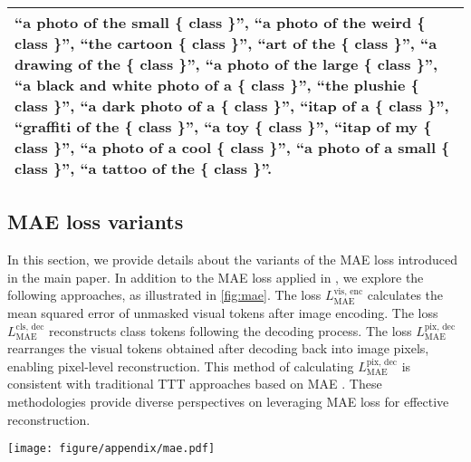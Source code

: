 \begin{table*}[t]
\begin{tabularx}{\textwidth}{X}
        ``a photo of the small \{ class \}'', ``a photo of the weird \{ class \}'', ``the cartoon \{ class \}'', ``art of the \{ class \}'', 
        ``a drawing of the \{ class \}'', ``a photo of the large \{ class \}'', ``a black and white photo of a \{ class \}'', ``the plushie \{ class \}'', 
        ``a dark photo of a \{ class \}'', ``itap of a \{ class \}'', ``graffiti of the \{ class \}'', ``a toy \{ class \}'', ``itap of my \{ class \}'', 
        ``a photo of a cool \{ class \}'', ``a photo of a small \{ class \}'', ``a tattoo of the \{ class \}''. \\
        \hline
    \end{tabularx}
\end{table*}

\subsection{MAE loss variants}
In this section, we provide details about the variants of the MAE loss introduced in the main paper.
In addition to the MAE loss applied in \name, we explore the following approaches, as illustrated in \cref{fig:mae}.
The loss \( L_{\text{MAE}}^{\text{vis, enc}} \) calculates the mean squared error of unmasked visual tokens after image encoding.
The loss \( L_{\text{MAE}}^{\text{cls, dec}} \) reconstructs class tokens following the decoding process.
The loss \( L_{\text{MAE}}^{\text{pix, dec}} \) rearranges the visual tokens obtained after decoding back into image pixels, enabling pixel-level reconstruction.
This method of calculating \( L_{\text{MAE}}^{\text{pix, dec}} \)  is consistent with traditional TTT approaches based on MAE \cite{gandelsman2022test,wang2023test}.
These methodologies provide diverse perspectives on leveraging MAE loss for effective reconstruction.

\begin{figure*}[t]
\centering
\texttt{[image: figure/appendix/mae.pdf]}
\caption{\textbf{Variants of MAE Loss.}}
\label{fig:mae}
\end{figure*}

